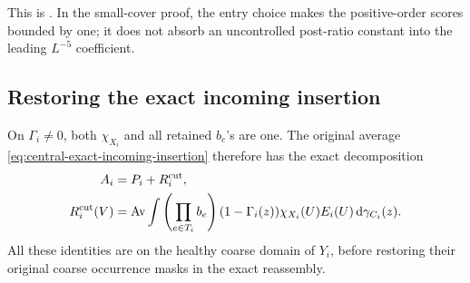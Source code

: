 \documentclass[11pt,reqno]{amsart}
\numberwithin{equation}{section}
\theoremstyle{definition}
\theoremstyle{remark}
\newcommand{\dd}{\mathrm d}
\begin{document}
This is \cite[Lemma~35.5, pp.~217--219]{Main}. In the
small-cover proof, the entry choice makes the positive-order
scores bounded by one; it does not absorb an uncontrolled
post-ratio constant into the leading \(L^{-5}\) coefficient.

\subsection{Restoring the exact incoming insertion}

On \(\Gamma_i\ne0\), both \(\chi_{X_i}\) and all retained
\(b_e\)'s are one. The original average
\eqref{eq:central-exact-incoming-insertion} therefore has
the exact decomposition
\begin{equation}
 \begin{split}
 A_i&=P_i+R_i^{\rm cut},\\
 R_i^{\rm cut}(V)&=\operatorname{Av}\int
    \left(\prod_{e\in T_i}b_e\right)(1-\Gamma_i(z))
             \chi_{X_i}(U)E_i(U)\,\dd\gamma_{C_i}(z).
 \end{split}
 \label{eq:sharp-exact-cutoff-remainder}
\end{equation}
All these identities are on the healthy coarse domain of
\(Y_i\), before restoring their original coarse occurrence
masks in the exact reassembly.
\end{document}
